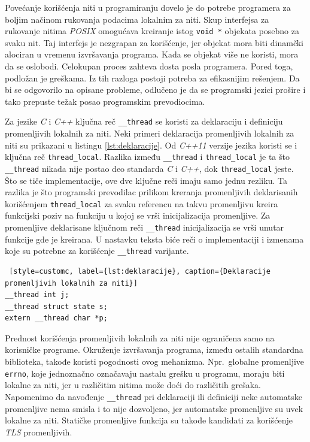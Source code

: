 \documentclass[12pt,oneside]{memoir}
\begin{document}
Povećanje korišćenja niti u programiranju dovelo je do potrebe programera za boljim načinom rukovanja podacima lokalnim za niti. Skup interfejsa za rukovanje nitima \emph{POSIX} \cite{POSIX} omogućava kreiranje istog \texttt{void *} objekata posebno za svaku nit. Taj interfejs je nezgrapan za korišćenje, jer objekat mora biti dinamčki alociran u vremenu izvršavanja programa. Kada se objekat više ne koristi, mora da se oslobodi. Celokupan proces zahteva dosta posla programera. Pored toga, podložan je greškama. Iz tih razloga postoji potreba za efikasnijim rešenjem. Da bi se odgovorilo na opisane probleme, odlučeno je da se programski jezici prošire i tako prepuste težak posao programskim prevodiocima.

Za jezike \emph{C} i \emph{C++} ključna reč \texttt{\_\_thread} se koristi za deklaraciju i definiciju promenljivih lokalnih za niti. Neki primeri deklaracija promenljivih lokalnih za niti su prikazani u listingu \ref{lst:deklaracije}. Od \emph{C++11} verzije jezika koristi se i ključna reč \texttt{thread\_local}. Razlika između \texttt{\_\_thread} i \texttt{thread\_local} je ta što \texttt{\_\_thread} nikada nije postao deo standarda \emph{C} i \emph{C++}, dok \texttt{thread\_local} jeste. Što se tiče implementacije, ove dve ključne reči imaju samo jednu rezliku. Ta razlika je što programski prevodilac prilikom kreranja promenljivih deklarisanih korišćenjem \texttt{thread\_local} za svaku referencu na takvu promenljivu kreira funkcijski poziv na funkciju u kojoj se vrši inicijalizacija promenljive. Za promenljive deklarisane ključnom reči \texttt{\_\_thread} inicijalizacija se vrši unutar funkcije gde je kreirana. U nastavku teksta biće reči o implementaciji i izmenama koje su potrebne za korišćenje \texttt{\_\_thread} varijante.

\begin{lstlisting} [style=customc, label={lst:deklaracije}, caption={Deklaracije promenljivih lokalnih za niti}]
__thread int j;
__thread struct state s;
extern __thread char *p;
\end{lstlisting}

Prednost korišćenja promenljivih lokalnih za niti nije ograničena samo na korisničke programe. Okruženje izvršavanja programa, između ostalih standardna biblioteka, takođe koristi pogodnosti ovog mehanizma. Npr.~globalne promenljive \texttt{errno}, koje jednoznačno označavaju nastalu grešku u programu, moraju biti lokalne za niti, jer u različitim nitima može doći do različitih grešaka. Napomenimo da navođenje \texttt{\_\_thread} pri deklaraciji ili definiciji neke automatske promenljive nema smisla i to nije dozvoljeno, jer automatske promenljive su uvek lokalne za niti.  Statičke promenljive funkcija su takođe kandidati za korišćenje \emph{TLS} promenljivih.
\end{document}
